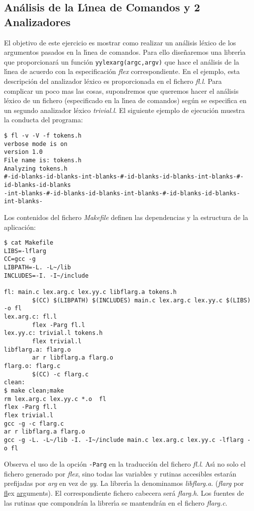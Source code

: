 \subsection{An\'alisis de la L\'{\i}nea de Comandos y 2 Analizadores}
El objetivo de este ejercicio es mostrar como realizar un
an\'alisis l\'exico de los argumentos pasados en la l\'{\i}nea de
comandos.  Para ello dise\~naremos una librer\'{\i}a que proporcionar\'a un 
funci\'on \verb|yylexarg(argc,argv)| que hace el an\'alisis
de la l\'{\i}nea de acuerdo con la especificaci\'on
\emph{flex} correspondiente. En el ejemplo, esta descripci\'on del analizador l\'exico
es proporcionada en el fichero \emph{fl.l}.  Para complicar un poco mas
las cosas, supondremos que queremos hacer el an\'alisis l\'exico
de un fichero (especificado en la l\'{\i}nea de comandos) seg\'un 
se especifica en un segundo analizador l\'exico \emph{trivial.l}.
El siguiente ejemplo de ejecuci\'on muestra la conducta del programa:
\begin{verbatim}
$ fl -v -V -f tokens.h
verbose mode is on
version 1.0
File name is: tokens.h
Analyzing tokens.h
#-id-blanks-id-blanks-int-blanks-#-id-blanks-id-blanks-int-blanks-#-id-blanks-id-blanks
-int-blanks-#-id-blanks-id-blanks-int-blanks-#-id-blanks-id-blanks-int-blanks-
\end{verbatim}
Los contenidos del fichero \emph{Makefile} definen las dependencias 
y la estructura de la aplicaci\'on:
\begin{verbatim}
$ cat Makefile
LIBS=-lflarg
CC=gcc -g
LIBPATH=-L. -L~/lib
INCLUDES=-I. -I~/include
 
fl: main.c lex.arg.c lex.yy.c libflarg.a tokens.h
        $(CC) $(LIBPATH) $(INCLUDES) main.c lex.arg.c lex.yy.c $(LIBS) -o fl
lex.arg.c: fl.l
        flex -Parg fl.l
lex.yy.c: trivial.l tokens.h
        flex trivial.l
libflarg.a: flarg.o
        ar r libflarg.a flarg.o
flarg.o: flarg.c
        $(CC) -c flarg.c
clean:                                 
$ make clean;make
rm lex.arg.c lex.yy.c *.o  fl
flex -Parg fl.l
flex trivial.l
gcc -g -c flarg.c
ar r libflarg.a flarg.o
gcc -g -L. -L~/lib -I. -I~/include main.c lex.arg.c lex.yy.c -lflarg -o fl  
\end{verbatim}
Observa el uso de la opci\'on \verb|-Parg| en la traducci\'on del fichero 
\emph{fl.l}. As\'{\i} no solo el fichero generado por \emph{flex}, sino todas las variables
y rutinas accesibles estar\'an prefijadas por \emph{arg} en vez de \emph{yy}. 
La librer\'{\i}a la denominamos \emph{libflarg.a}. (\emph{flarg} 
por \underline{fl}ex \underline{arg}uments). 
El correspondiente fichero cabecera ser\'a \emph{flarg.h}.
Los fuentes de las rutinas que compondr\'an la 
librer\'{\i}a se mantendr\'an en el fichero \emph{flarg.c}.


